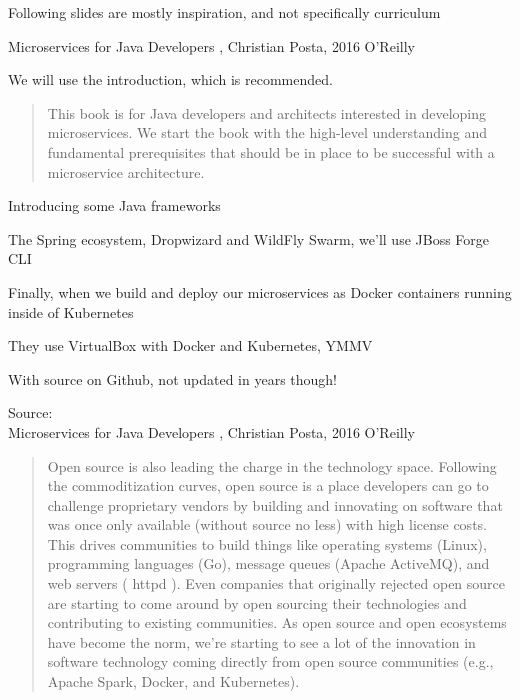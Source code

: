 \documentclass[Screen16to9,17pt]{foils}
\begin{document}


Following slides are mostly inspiration, and not specifically curriculum



Microservices for Java Developers , Christian Posta, 2016 O’Reilly\\

We will use the introduction, which is recommended.


\begin{quote}
This book is for Java developers and architects interested in developing microservices. We start the book with the high-level understanding and fundamental prerequisites that should be in place to be successful with a microservice architecture.
\end{quote}

Introducing some Java frameworks
\begin{list2}
\item The Spring ecosystem, Dropwizard and WildFly Swarm, we’ll use JBoss Forge CLI
\item Finally, when we build and deploy our microservices as Docker containers running inside of Kubernetes
\item They use VirtualBox with Docker and Kubernetes, YMMV
\item With source on Github, not updated in years though!\\
\end{list2}
Source: {\footnotesize\\
Microservices for Java Developers , Christian Posta, 2016 O’Reilly}




\begin{quote}\small
Open source is also leading the charge in the technology space. Following the commoditization curves, open source is a place developers can go to challenge proprietary vendors by building and
  innovating on software that was once only available (without source
  no less) with high license costs. This drives communities to build
  things like operating systems (Linux), programming languages (Go),
  message queues (Apache ActiveMQ), and web servers ( httpd ). Even
  companies that originally rejected open source are starting to come
  around by open sourcing their technologies and contributing to
  existing communities. As open source and open ecosystems have
  become the norm, we’re starting to see a lot of the innovation in
  software technology coming directly from open source communities
  (e.g., Apache Spark, Docker, and Kubernetes).
\end{quote}
\end{document}
